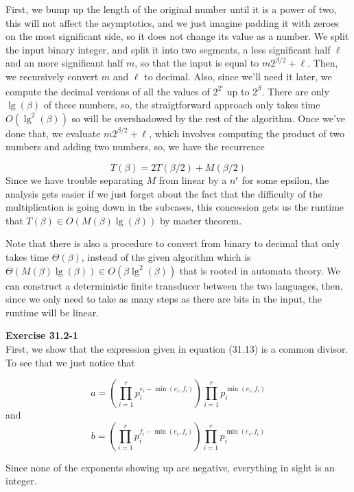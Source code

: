 \documentclass{article}
\begin{document}
First, we bump up the length of the original number until it is a power of two, this will not affect the asymptotics, and we just imagine padding it with zeroes on the most significant side, so it does not change its value as a number. We split the input binary integer, and split it into two segments, a less significant half $\ell$ and an more significant half $m$, so that the input is equal to $m2^{\beta/2} + \ell$. Then, we recursively convert $m$ and $\ell$ to decimal. Also, since we'll need it later, we compute the decimal versions of all the values of $2^{2^i}$ up to $2^{\beta}$. There are only $\lg(\beta)$ of these numbers, so, the straigtforward approach only takes time $O(\lg^2(\beta))$ so will be overshadowed by the rest of the algorithm. Once we've done that, we evaluate $m2^{\beta/2} + \ell$, which involves computing the product of two numbers and adding two numbers, so, we have the recurrence

\[
T( \beta) = 2T(\beta/2) + M(\beta/2)
\]
Since we have trouble separating $M$ from linear by a $n^{\epsilon}$ for some epsilon, the analysis gets easier if we just forget about the fact that the difficulty of the multiplication is going down in the subcases, this concession gets us the runtime that $T(\beta) \in O(M(\beta) \lg(\beta))$ by master theorem.

Note that there is also a procedure to convert from binary to decimal that only takes time $\Theta(\beta)$, instead of the given algorithm which is $\Theta(M(\beta)\lg(\beta)) \in O(\beta \lg^2(\beta))$ that is rooted in automata theory. We can construct a deterministic finite transducer between the two languages, then, since we only need to take as many steps as there are bits in the input, the runtime will be linear. 



\noindent\textbf{Exercise 31.2-1}\\

First, we show that the expression given in equation (31.13) is a common divisor. To see that we just notice that 

\[
a = (\prod_{i=1}^r p_i^{e_i-\min(e_i,f_i)})\prod_{i=1}^r p_i^{\min(e_i,f_i)}
\]
and 
\[
b = (\prod_{i=1}^r p_i^{f_i-\min(e_i,f_i)})\prod_{i=1}^r p_i^{\min(e_i,f_i)}
\]

Since none of the exponents showing up are negative, everything in sight is an integer.
\end{document}
